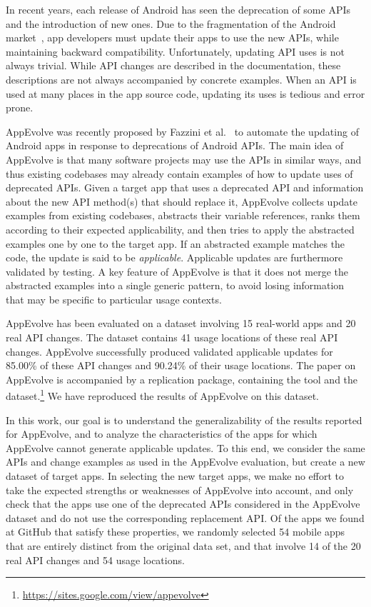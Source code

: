 In recent years, each release of Android has seen the deprecation of some
APIs and the introduction of new ones.  Due to the fragmentation of the
Android market~\cite{he2018understanding,li2018cid}, app developers must
update their apps to use the new APIs, while maintaining backward
compatibility.  Unfortunately, updating API uses is not always trivial.
While API changes are described in the documentation, these descriptions
are not always accompanied by concrete examples.  When an API is used at
many places in the app source code, updating its uses is tedious and
error prone.

AppEvolve was recently proposed by Fazzini et
al.~\cite{fazzini2019automated} to automate the updating of Android apps in
response to deprecations of Android APIs.  The main idea of AppEvolve is
that many software projects may use the APIs in similar ways, and thus
existing codebases may already contain examples of how to update uses of
deprecated APIs.  Given a target app that uses a deprecated API and
information about the new API method(s) that should replace it, AppEvolve
collects update examples from existing codebases, abstracts their variable
references, ranks them according to their expected applicability, and then
tries to apply the abstracted examples one by one to the target app.  If an
abstracted example matches the code, the update is said to be {\em
applicable}.  Applicable updates are furthermore validated by testing.  A
key feature of AppEvolve is that it does not merge the abstracted examples
into a single generic pattern, to avoid losing information that may be
specific to particular usage contexts.

AppEvolve has been evaluated on a dataset involving 15 real-world apps and
20 real API changes. The dataset contains 41 usage locations of these real
 API changes. AppEvolve successfully produced validated applicable updates
for 85.00\% of these API changes and 90.24\% of their usage locations.  The
paper on AppEvolve is accompanied by a replication package, containing the
tool and the
dataset.\footnote{\url{https://sites.google.com/view/appevolve}} We have
reproduced the results of AppEvolve on this dataset.

In this work, our goal is to understand the generalizability of the results
reported for AppEvolve, and to analyze the characteristics of the apps for
which AppEvolve cannot generate applicable updates.  To this end, we
consider the same APIs and change examples as used in the AppEvolve
evaluation, but create a new dataset of target apps.  In selecting the new
target apps, we make no effort to take the expected strengths or weaknesses
of AppEvolve into account, and only check that the apps use one of the
deprecated APIs considered in the AppEvolve dataset and do not use the
corresponding replacement API.  Of the apps we found at GitHub that satisfy
these properties, we randomly selected 54 mobile apps that are entirely
distinct from the original data set, and that involve 14 of the 20 real API
changes and 54 usage locations.

